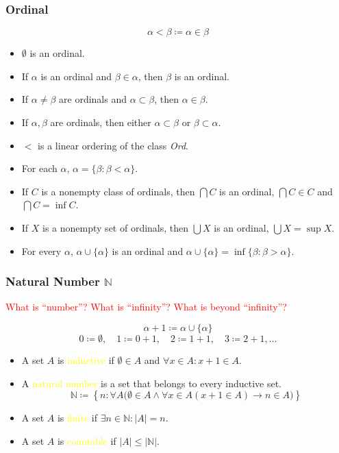 \documentclass[UTF8,aspectratio=43,11pt,colorlinks,compress,openany]{beamer}%
\begin{document}
\begin{frame}\frametitle{Ordinal}
	\[\alpha<\beta\coloneqq \alpha\in\beta\]
	\begin{itemize}
		\item $\emptyset$ is an ordinal.
		\item If $\alpha$ is an ordinal and $\beta\in\alpha$, then $\beta$ is an ordinal.
		\item If $\alpha\neq\beta$ are ordinals and $\alpha\subset\beta$, then $\alpha\in\beta$.
		\item If $\alpha,\beta$ are ordinals, then either $\alpha\subset\beta$ or $\beta\subset\alpha$.
		\item $<$ is a linear ordering of the class \emph{Ord}.
		\item For each $\alpha$, $\alpha=\{\beta:\beta<\alpha\}$.
		\item If $C$ is a nonempty class of ordinals, then $\bigcap C$ is an ordinal, $\bigcap C\in C$ and $\bigcap C=\inf C$.
		\item If $X$ is a nonempty set of ordinals, then $\bigcup X$ is an ordinal, $\bigcup X=\sup X$.
		\item For every $\alpha$, $\alpha\cup\{\alpha\}$ is an ordinal and $\alpha\cup\{\alpha\}=\inf\{\beta:\beta>\alpha\}$.
	\end{itemize}
\end{frame}

\begin{frame}\frametitle{Natural Number $\mathbb{N}$}
	\begin{block}{}
		\centering\textcolor{red}{What is ``number''? What is ``infinity''? What is beyond ``infinity''?}
	\end{block}
	\[\alpha+1\coloneqq \alpha\cup\{\alpha\}\]
	\[0\coloneqq \emptyset,\quad 1\coloneqq 0+1,\quad 2\coloneqq 1+1,\quad 3\coloneqq 2+1, \dots\]
	\begin{itemize}
		\item A set $A$ is \textcolor{yellow}{inductive} if $\emptyset\in A$ and $\forall x\in A: x+1\in A$.
		\item A \textcolor{yellow}{natural number} is a set that belongs to every inductive set.
		\[\mathbb{N}\coloneqq \left\{n: \forall A\big(\emptyset\in A\wedge \forall x\in A(x+1\in A)\to n\in A\big)\right\}\]
		\item A set $A$ is \textcolor{yellow}{finite} if $\exists n\in\mathbb{N}: |A|=n$.
		\item A set $A$ is \textcolor{yellow}{countable} if $|A|\leq|\mathbb{N}|$.
	\end{itemize}
\end{frame}
\end{document}
